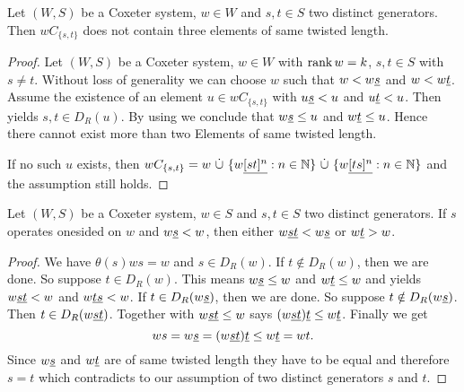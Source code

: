 \begin{lemm}
	 Let $(W,S)$ be a Coxeter system, $w \in W$ and $s,t \in S$ two distinct generators. Then $wC_{\{s,t\}}$ does not contain three elements of same twisted length.

	\begin{proof}
		Let $(W,S)$ be a Coxeter system, $w \in W$ with $\operatorname{rank} w = k$, $s, t \in S$ with $s \neq t$. Without loss of generality we can choose $w$ such that $w < w \underline{s}$ and $w < w \underline{t}$. Assume the existence of an element $u \in wC_{\{s,t\}}$ with $u \underline{s} < u$ and $u \underline{t} < u$. Then \cite[Lemma 3.8]{hultman:comb-twisted-invo} yields $s,t \in D_R(u)$. By using \cite[Lemma 3.9]{hultman:comb-twisted-invo} we conclude that $w \underline{s} \leq u$ and $w \underline{t} \leq u$. Hence there cannot exist more than two Elements of same twisted length.

		If no such $u$ exists, then $wC_{\{s,t\}} = w \ \dot \cup \ \{ w \ul{[st]^n} : n \in \nn \} \ \dot \cup \ \{ w \ul{[ts]^n} : n \in \nn \}$ and the assumption still holds.
	\end{proof}
\end{lemm}

\begin{lemm}
	Let $(W,S)$ be a Coxeter system, $w \in S$ and $s,t \in S$ two distinct generators. If $s$ operates onesided on $w$ and $w \underline{s} < w$, then either $w \underline{st} < w \underline{s}$ or $w \underline{t} > w$.

	\begin{proof}
		We have $\theta(s)ws = w$ and $s \in D_R(w)$. If $t \notin D_R(w)$, then we are done. So suppose $t \in D_R(w)$. This means $w \underline{s} \leq w$ and $w \underline{t} \leq w$ and \cite[Lemma 3.9]{hultman:comb-twisted-invo} yields $w \underline{st} < w$ and $w \underline{ts} < w$. If $t \in D_R(w \underline{s})$, then we are done. So suppose $t \notin D_R(w \underline{s})$. Then $t \in D_R(w \underline{st})$. Together with $w \underline{st} \leq w$ \cite[Lemma 3.9(2)]{hultman:comb-twisted-invo} says $(w \underline{st}) \underline{t} \leq w \underline{t}$. Finally we get
		$$ ws = w \underline{s} = (w \underline{st}) \underline{t} \leq w \underline{t} = wt.$$
		Since $w \underline{s}$ and $w \underline{t}$ are of same twisted length they have to be equal and therefore $s = t$ which contradicts to our assumption of two distinct generators $s$ and $t$.
	\end{proof}
\end{lemm}